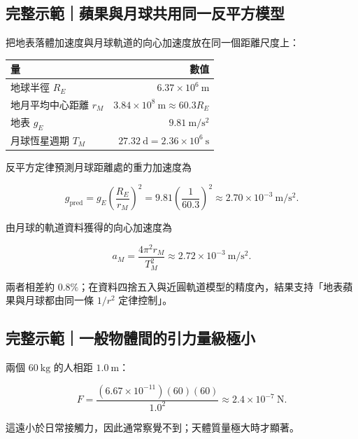 \documentclass[11pt,a4paper]{article}
\newcounter{none}
\begin{document}
\begin{HandoutWorkedExample}

\subsection{完整示範｜蘋果與月球共用同一反平方模型}\label{ux5b8cux6574ux793aux7bc4ux860bux679cux8207ux6708ux7403ux5171ux7528ux540cux4e00ux53cdux5e73ux65b9ux6a21ux578b}

把地表落體加速度與月球軌道的向心加速度放在同一個距離尺度上：

{\def\LTcaptype{none} %
\begin{longtable}[]{@{}lr@{}}
\toprule\noalign{}
量 & 數值 \\
\midrule\noalign{}
\endhead
\bottomrule\noalign{}
\endlastfoot
地球半徑 \(R_E\) & \(6.37\times10^6\ \mathrm m\) \\
地月平均中心距離 \(r_M\) & \(3.84\times10^8\ \mathrm m\approx60.3R_E\) \\
地表 \(g_E\) & \(9.81\ \mathrm{m/s^2}\) \\
月球恆星週期 \(T_M\) & \(27.32\ \mathrm d=2.36\times10^6\ \mathrm s\) \\
\end{longtable}
}

反平方定律預測月球距離處的重力加速度為

\[
g_{\mathrm{pred}}
=g_E\left(\frac{R_E}{r_M}\right)^2
=9.81\left(\frac1{60.3}\right)^2
\approx2.70\times10^{-3}\ \mathrm{m/s^2}.
\]

由月球的軌道資料獲得的向心加速度為

\[
a_M=\frac{4\pi^2r_M}{T_M^2}
\approx2.72\times10^{-3}\ \mathrm{m/s^2}.
\]

兩者相差約 \(0.8\%\)；在資料四捨五入與近圓軌道模型的精度內，結果支持「地表蘋果與月球都由同一條 \(1/r^2\) 定律控制」。

\end{HandoutWorkedExample}

\begin{HandoutWorkedExample}

\subsection{完整示範｜一般物體間的引力量級極小}\label{ux5b8cux6574ux793aux7bc4ux4e00ux822cux7269ux9ad4ux9593ux7684ux5f15ux529bux91cfux7d1aux6975ux5c0f}

兩個 \(60\ \mathrm{kg}\) 的人相距 \(1.0\ \mathrm m\)：

\[
F=\frac{(6.67\times10^{-11})(60)(60)}{1.0^2}
\approx2.4\times10^{-7}\ \mathrm N.
\]

這遠小於日常接觸力，因此通常察覺不到；天體質量極大時才顯著。

\end{HandoutWorkedExample}
\end{document}
